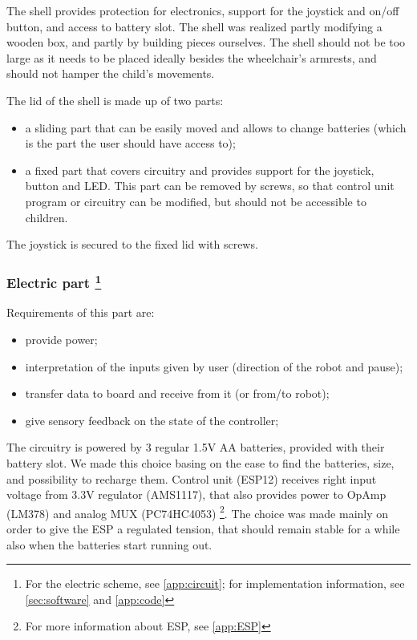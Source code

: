 \documentclass[a4paper,twoside]{book}
\begin{document}
The shell provides protection for electronics, support for the joystick and on/off button, and access to battery slot. The shell was realized partly modifying a wooden box, and partly by building pieces ourselves. The shell should not be too large as it needs to be placed ideally besides the wheelchair's armrests, and should not hamper the child's movements.

\beforelist The lid of the shell is made up of two parts:
\begin{itemize}
\item a sliding part that can be easily moved and allows to change batteries (which is the part the user should have access to);
\item a fixed part that covers circuitry and provides support for the joystick, button and LED. This part can be removed by screws, so that control unit program or circuitry can be modified, but should not be accessible to children.
\end{itemize}
\afterlist
The joystick is secured to the fixed lid with screws.

\subsubsection[Electric part]{Electric part \footnote{For the electric scheme, see \autoref{app:circuit}; for implementation information, see \autoref{sec:software} and \autoref{app:code}}}
\beforelist Requirements of this part are: 
\begin{itemize}
\item provide power;
\item interpretation of the inputs given by user (direction of the robot and pause);
\item transfer data to board and receive from it (or from/to robot);
\item give sensory feedback on the state of the controller;
\end{itemize}
\afterlist*
The circuitry is powered by 3 regular 1.5V AA batteries, provided with their battery slot. We made this choice basing on the ease to find the batteries, size, and possibility to recharge them. Control unit (ESP12) receives right input voltage from 3.3V regulator (AMS1117), that also provides power to Op\textendash Amp (LM378) and analog MUX (PC74HC4053)
\footnote{For more information about ESP, see \autoref{app:ESP}}.
The choice was made mainly on order to give the ESP a regulated tension, that should remain stable for a while also when the batteries start running out.
\end{document}
